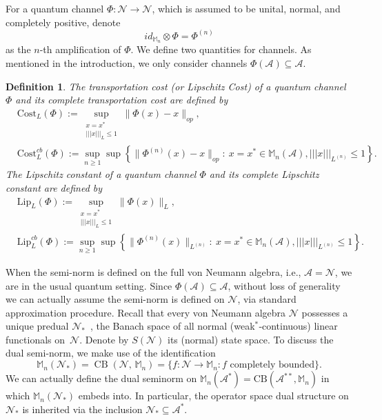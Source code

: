 \documentclass[11pt,reqno]{amsart}
\makeatletter
\numberwithin{equation}{section}
\newtheorem{definition}[lemma]{Definition}
\newcommand{\mb}{\mathbb}
\newcommand{\mc}{\mathcal}
\newcommand{\Lip}{\mathrm{Lip}}
\newcommand{\Cost}{\mathrm{Cost}}
\DeclareRobustCommand\frownotimes{\mathbin{\mathpalette\frown@otimes\relax}}
\newcommand{\frown@otimes}[2]{%
  \vbox{
    \ialign{##\cr
      \hidewidth$\m@th#1{}_\frown$\kern-\scriptspace\hidewidth\cr
      \noalign{\nointerlineskip\kern-1pt}
      $\m@th#1\otimes$\cr
    }%
  }%
}
\makeatother
\begin{document}
For a quantum channel $\Phi: \mc N \to \mc N$, which is assumed to be unital, normal, and completely positive, denote 
\begin{equation}
   id_{\mb M_n}\otimes \Phi = \Phi^{(n)} 
\end{equation}
as the $n$-th amplification of $\Phi$. We define two quantities for channels. As mentioned in the introduction, we only consider channels $\Phi(\mc A)\subseteq \mc A$.
\begin{definition}\label{def:cost and constant}
The transportation cost (or Lipschitz Cost) of a quantum channel $\Phi$ and its complete transportation cost are defined by 
\begin{align}
    & \Cost_{L}(\Phi) := \sup_{\substack{x=x^* \\ |||x|||_L \le 1}} \|\Phi(x) - x\|_{op}, \\
    & \Cost_{L}^{cb}(\Phi) := \sup_{n\ge 1} \sup \left\{\|\Phi^{(n)}(x) - x\|_{op}:\ x=x^*\in \mb M_n(\mc A), |||x|||_{L^{(n)}} \le 1\right\}.
\end{align}
The Lipschitz constant of a quantum channel $\Phi$ and its complete Lipschitz constant are defined by 
\begin{align}
    & \Lip_L(\Phi) := \sup_{\substack{x=x^* \\ |||x|||_L \le 1}} \|\Phi(x)\|_L, \label{def: Lipschitz constant}\\
    & \Lip^{cb}_L(\Phi) := \sup_{n\ge 1}\sup \left\{\|\Phi^{(n)}(x)\|_{L^{(n)}}:\ x=x^*\in \mb M_n(\mc A), |||x|||_{L^{(n)}} \le 1\right\}. \label{def: complete Lipschitz constant}
\end{align}
\end{definition}
When the semi-norm is defined on the full von Neumann algebra, i.e., $\mc A = \mc N$, we are in the usual quantum setting. Since $\Phi(\mc A) \subseteq \mc A$, without loss of generality we can actually assume the semi-norm is defined on $\mc N$, via standard approximation procedure. Recall that every von Neumann algebra $\mathcal N$ possesses a unique predual
$\mathcal N_{*}$~\cite{sakai2012}, the Banach space of all normal
(weak$^{*}$‑continuous) linear functionals on~$\mathcal N$. Denote by $S(\mathcal N)$ its (normal) state space. 
To discuss the dual semi-norm, we make use of the identification
\begin{equation}\label{eq:complete-isometry}
   \mb M_n(\mathcal N_{*})
=   \operatorname{CB}(\mathcal N,\,\mb M_n) = \{f: \mc N \to \mb M_n: f\text{\ completely\ bounded}\}.
\end{equation}
We can actually define the dual seminorm on $\mb M_n(\mc A^*) = \mathrm{CB}(\mc A^{**},\mb M_n)$ in which $\mb M_n(\mc N_*)$ embeds into. In particular, the operator space dual structure on $\mc N_*$ is inherited via the inclusion $\mc N_* \subseteq \mc A^*$.
\end{document}
